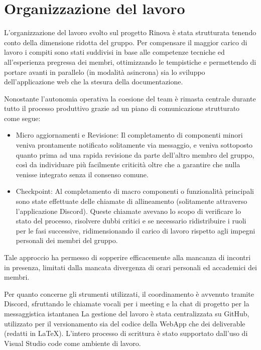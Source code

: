 \setcounter{section}{0}
\setlength{\parindent}{0pt}  %
\setlength{\parskip}{6pt}
\setlength{\itemsep}{3pt}
\section{Organizzazione del lavoro}
L'organizzazione del lavoro svolto sul progetto Rinova è stata strutturata tenendo conto della dimensione ridotta del gruppo.
Per compensare il maggior carico di lavoro i compiti sono stati suddivisi in base alle competenze tecniche
ed all'esperienza pregressa dei membri, ottimizzando le tempistiche e permettendo di portare avanti in parallelo (in modalità asincrona) sia lo sviluppo dell'applicazione web che la stesura della documentazione.

Nonostante l'autonomia operativa la coesione del team è rimasta centrale durante tutto il processo produttivo grazie ad un piano di comunicazione strutturato come segue:

\begin{itemize}
    \item Micro aggiornamenti e Revisione: Il completamento di componenti minori veniva prontamente notificato solitamente via messaggio, e veniva sottoposto quanto prima ad una rapida revisione da parte dell'altro membro del gruppo, così da individuare più facilmente criticità oltre che a garantire che nulla venisse integrato senza il consenso comune.
    \item Checkpoint: Al completamento di macro componenti o funzionalità principali sono state effettuate delle chiamate di allineamento (solitamente attraverso l'applicazione Discord). Queste chiamate avevano lo scopo di verificare lo stato del processo, risolvere dubbi critici e se necessario ridistribuire i ruoli per le fasi successive, ridimensionando il carico di lavoro rispetto agli impegni personali dei membri del gruppo.
\end{itemize}

Tale approccio ha permesso di sopperire efficacemente alla mancanza di incontri in presenza, limitati dalla mancata divergenza di orari personali ed accademici dei membri.

Per quanto concerne gli strumenti utilizzati, il coordinamento è avvenuto tramite Discord, sfruttando le chiamate vocali per i meeting e la chat di progetto per la messaggistica istantanea La gestione del lavoro è stata centralizzata su GitHub, utilizzato per il versionamento sia del codice della WebApp che dei deliverable (redatti in LaTeX).
L'intero processo di scrittura è stato supportato dall'uso di Visual Studio code come ambiente di lavoro.
